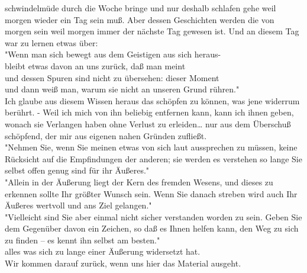 \documentclass[
]{article}
\begin{document}
schwindelmüde durch die Woche bringe und nur deshalb schlafen gehe weil
morgen wieder ein Tag sein muß. Aber dessen Geschichten werden die von
morgen sein weil morgen immer der nächste Tag gewesen ist. Und an diesem
Tag war zu lernen etwas über:\\
"Wenn man sich bewegt aus dem Geistigen aus sich heraus-\\
bleibt etwas davon an uns zurück, daß man meint\\
und dessen Spuren sind nicht zu übersehen: dieser Moment\\
und dann weiß man, warum sie nicht an unseren Grund rühren."\\
Ich glaube aus diesem Wissen heraus das schöpfen zu können, was jene
widerrum berührt. - Weil ich mich von ihn beliebig entfernen kann, kann
ich ihnen geben, wonach sie Verlangen haben ohne Verlust zu
erleiden\ldots{} nur aus dem Überschuß schöpfend, der mir aus eigenen
nahen Gründen zufließt.\\
"Nehmen Sie, wenn Sie meinen etwas von sich laut aussprechen zu müssen,
keine Rücksicht auf die Empfindungen der anderen; sie werden es
verstehen so lange Sie selbst offen genug sind für ihr Äußeres."\\
"Allein in der Äußerung liegt der Kern des fremden Wesens, und dieses zu
erkennen sollte Ihr größter Wunsch sein. Wenn Sie danach streben wird
auch Ihr Äußeres wertvoll und ans Ziel gelangen."\\
"Vielleicht sind Sie aber einmal nicht sicher verstanden worden zu sein.
Geben Sie dem Gegenüber davon ein Zeichen, so daß es Ihnen helfen kann,
den Weg zu sich zu finden -- es kennt ihn selbst am besten."\\
alles was sich zu lange einer Äußerung widersetzt hat.\\
Wir kommen darauf zurück, wenn uns hier das Material ausgeht.
\end{document}
